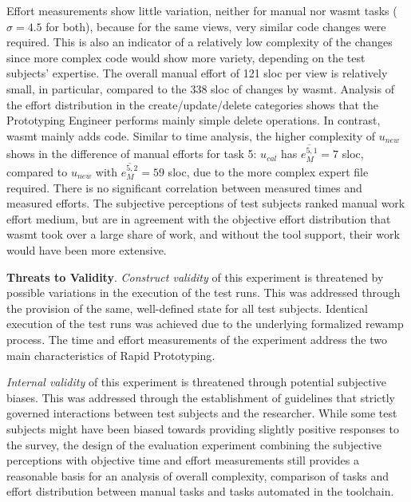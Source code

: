 Effort measurements show little variation, neither for manual nor \gls{wasmt} tasks (\(\sigma = 4.5\) for both), because for the same views, very similar code changes were required.
This is also an indicator of a relatively low complexity of the changes since more complex code would show more variety, depending on the test subjects' expertise.
The overall manual effort of 121 \gls{sloc} per view is relatively small, in particular, compared to the 338 \gls{sloc} of changes by \gls{wasmt}.
Analysis of the effort distribution in the create/update/delete categories shows that the Prototyping Engineer performs mainly simple delete operations.
In contrast, \gls{wasmt} mainly adds code.
Similar to time analysis, the higher complexity of \(u_{new}\) shows in the difference of manual efforts for task 5: \(u_{cal}\) has \(\overline{e_M^{5,1}}=7\) \gls{sloc}, compared to \(u_{new}\) with \(\overline{e_M^{5,2}}=59\) \gls{sloc}, due to the more complex expert file required.
There is no significant correlation between measured times and measured efforts.
The subjective perceptions of test subjects ranked manual work effort medium, but are in agreement with the objective effort distribution that \gls{wasmt} took over a large share of work, and without the tool support, their work would have been more extensive.

\textbf{Threats to Validity}.
\emph{Construct validity} of this experiment is threatened by possible variations in the execution of the test runs.
This was addressed through the provision of the same, well-defined state for all test subjects.
Identical execution of the test runs was achieved due to the underlying formalized \gls{rewamp} process.
The time and effort measurements of the experiment address the two main characteristics of \gls{Rapid Prototyping}.

\emph{Internal validity} of this experiment is threatened through potential subjective biases.
This was addressed through the establishment of guidelines that strictly governed interactions between test subjects and the researcher.
While some test subjects might have been biased towards providing slightly positive responses to the survey, the design of the evaluation experiment combining the subjective perceptions with objective time and effort measurements still provides a reasonable basis for an analysis of overall complexity, comparison of tasks and effort distribution between manual tasks and tasks automated in the toolchain.

